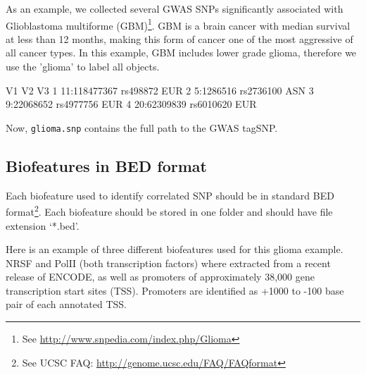 \documentclass[12pt,fullpage]{article}
\newcommand{\Robject}[1]{{\texttt{#1}}}
\begin{document}
As an example, we collected several GWAS SNPs significantly associated with
Glioblastoma multiforme (GBM)\footnote{See
\url{http://www.snpedia.com/index.php/Glioma}}. GBM is a brain cancer with
median survival at less than 12 months, making this form of cancer one of the
most aggressive of all cancer types. In this example, GBM includes lower grade
glioma, therefore we use the 'glioma' to label all objects.

\begin{Schunk}
\begin{Soutput}
            V1        V2  V3
1 11:118477367  rs498872 EUR
2    5:1286516 rs2736100 ASN
3   9:22068652 rs4977756 EUR
4  20:62309839 rs6010620 EUR
\end{Soutput}
\end{Schunk}

Now, \Robject{glioma.snp} contains the full path to the GWAS tagSNP. 

\subsection{Biofeatures in BED format}

Each biofeature used to identify correlated SNP should be in standard BED
format\footnote{See UCSC FAQ: \url{http://genome.ucsc.edu/FAQ/FAQformat}}. Each
biofeature should be stored in one folder and should have file extension
`*.bed'.

Here is an example of three different biofeatures used for this glioma example.
NRSF and PolII (both transcription factors) where extracted from a recent
release of ENCODE, as well as promoters of approximately 38,000 gene
transcription start sites (TSS). Promoters are identified as +1000 to -100 base
pair of each annotated TSS.
\end{document}
